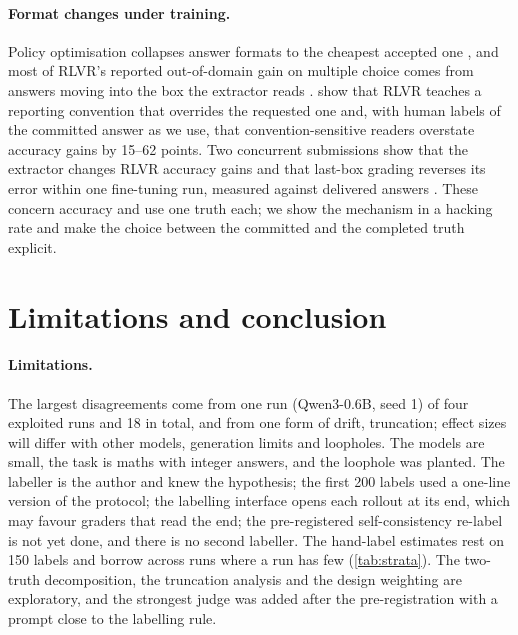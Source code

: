 \documentclass[10pt]{article}
\begin{document}
\paragraph{Format changes under training.} Policy optimisation collapses answer formats to the cheapest accepted
one \citep{sanyal2026format}, and most of RLVR's reported out-of-domain gain on multiple choice comes from
answers moving into the box the extractor reads \citep{lyu2026samebox}. \citet{chang2026reporting} show that
RLVR teaches a reporting convention that overrides the requested one and, with human labels of the committed
answer as we use, that convention-sensitive readers overstate accuracy gains by 15--62 points. Two concurrent
submissions show that the extractor changes RLVR accuracy gains \citep{anon2027extractor} and that last-box
grading reverses its error within one fine-tuning run, measured against delivered answers
\citep{anon2027strict}. These concern accuracy and use one truth each; we show the mechanism in a hacking rate
and make the choice between the committed and the completed truth explicit.

\section{Limitations and conclusion}
\label{sec:conclusion}
\paragraph{Limitations.} The largest disagreements come from one run (Qwen3-0.6B, seed 1) of four exploited runs
and 18 in total, and from one form of drift, truncation; effect sizes will differ with other models, generation
limits and loopholes. The models are small, the task is maths with integer answers, and the loophole was planted.
The labeller is the author and knew the hypothesis; the first 200 labels used a one-line version of the protocol;
the labelling interface opens each rollout at its end, which may favour graders that read the end; the
pre-registered self-consistency re-label is not yet done, and there is no second labeller. The hand-label estimates
rest on 150 labels and borrow across runs where a run has few (\cref{tab:strata}). The two-truth decomposition, the
truncation analysis and the design weighting are exploratory, and the strongest judge was added after the
pre-registration with a prompt close to the labelling rule.
\end{document}
